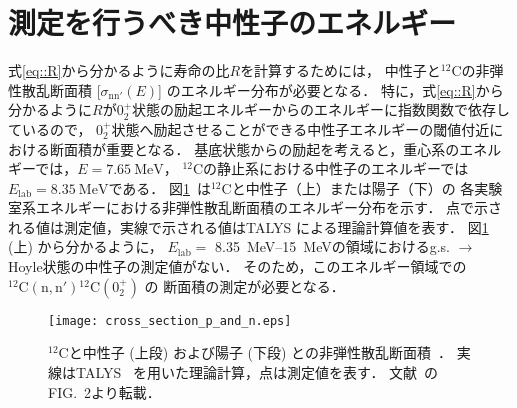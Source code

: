 \documentclass[../master]{subfiles}
\begin{document}
\section{測定を行うべき中性子のエネルギー}
式\eqref{eq::R}から分かるように寿命の比$R$を計算するためには，
中性子と${}^{12}\mathrm{C}$の非弾性散乱断面積 [$\sigma_\mathrm{nn'} (E)$] のエネルギー分布が必要となる．
特に，式\eqref{eq::R}から分かるように$R$が$0_2^+$状態の励起エネルギーからのエネルギーに指数関数で依存しているので，
$0_2^+$状態へ励起させることができる中性子エネルギーの閾値付近における断面積が重要となる．
基底状態からの励起を考えると，重心系のエネルギーでは，$E=\SI{7.65}{\mega\electronvolt}$，
${}^{12}\mathrm{C}$の静止系における中性子のエネルギーでは$E_{\text{lab}} = \SI{8.35}{\mega\electronvolt}$である．
図\ref{fig::crosssection_pres}~\cite{hotdensemedium}は${}^{12}\mathrm{C}$と中性子（上）または陽子（下）の
各実験室系エネルギーにおける非弾性散乱断面積のエネルギー分布を示す．
点で示される値は測定値，実線で示される値はTALYS による理論計算値を表す．
図\ref{fig::crosssection_pres} (上) から分かるように，
$E_{\text{lab}} =$ \SIrange{8.35}{15}{\mega\electronvolt}の領域におけるg.s. $\rightarrow$ Hoyle状態の中性子の測定値がない．
そのため，このエネルギー領域での ${}^{12}\mathrm{C}(\mathrm{n},\mathrm{n}'){}^{12}\mathrm{C} (0_2^+)$ の
断面積の測定が必要となる．
\begin{figure}
  \centering
  \texttt{[image: cross\_section\_p\_and\_n.eps]}
  \caption[${}^{12}\mathrm{C}$と中性子 (上段) および陽子 (下段) との非弾性散乱断面積．]
          {${}^{12}\mathrm{C}$と中性子 (上段) および陽子 (下段) との非弾性散乱断面積~\cite{hotdensemedium}．
            実線はTALYS~\cite{talys-1.0} を用いた理論計算，点は測定値を表す．
          文献~\cite{hotdensemedium}のFIG.~2より転載．}
  \label{fig::crosssection_pres}
\end{figure}
\end{document}
